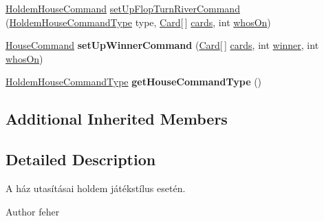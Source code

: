 \begin{DoxyCompactItemize}
\item 
\hyperlink{classhu_1_1elte_1_1bfw1p6_1_1poker_1_1command_1_1holdem_1_1_holdem_house_command}{Holdem\+House\+Command} \hyperlink{classhu_1_1elte_1_1bfw1p6_1_1poker_1_1command_1_1holdem_1_1_holdem_house_command_a6b278bd5bcc8114b0eadb3bcdeb4746c}{set\+Up\+Flop\+Turn\+River\+Command} (\hyperlink{enumhu_1_1elte_1_1bfw1p6_1_1poker_1_1command_1_1holdem_1_1type_1_1_holdem_house_command_type}{Holdem\+House\+Command\+Type} type, \hyperlink{classcom_1_1cantero_1_1games_1_1poker_1_1texasholdem_1_1_card}{Card}\mbox{[}$\,$\mbox{]} \hyperlink{classhu_1_1elte_1_1bfw1p6_1_1poker_1_1command_1_1_house_command_a2415f2465575a55375e7984a075eb17c}{cards}, int \hyperlink{classhu_1_1elte_1_1bfw1p6_1_1poker_1_1command_1_1_house_command_ad2d082dbec0a324d62472e5c48ef257f}{whos\+On})
\item 
\hypertarget{classhu_1_1elte_1_1bfw1p6_1_1poker_1_1command_1_1holdem_1_1_holdem_house_command_ab1ad29e1819296a43ba7b74bbd47c61d}{}\hyperlink{classhu_1_1elte_1_1bfw1p6_1_1poker_1_1command_1_1_house_command}{House\+Command} {\bfseries set\+Up\+Winner\+Command} (\hyperlink{classcom_1_1cantero_1_1games_1_1poker_1_1texasholdem_1_1_card}{Card}\mbox{[}$\,$\mbox{]} \hyperlink{classhu_1_1elte_1_1bfw1p6_1_1poker_1_1command_1_1_house_command_a2415f2465575a55375e7984a075eb17c}{cards}, int \hyperlink{classhu_1_1elte_1_1bfw1p6_1_1poker_1_1command_1_1_house_command_a7dc7a32601c36758c216ddca0fc9999e}{winner}, int \hyperlink{classhu_1_1elte_1_1bfw1p6_1_1poker_1_1command_1_1_house_command_ad2d082dbec0a324d62472e5c48ef257f}{whos\+On})\label{classhu_1_1elte_1_1bfw1p6_1_1poker_1_1command_1_1holdem_1_1_holdem_house_command_ab1ad29e1819296a43ba7b74bbd47c61d}

\item 
\hypertarget{classhu_1_1elte_1_1bfw1p6_1_1poker_1_1command_1_1holdem_1_1_holdem_house_command_a4fc16cade6201530aa0c7447c24c4463}{}\hyperlink{enumhu_1_1elte_1_1bfw1p6_1_1poker_1_1command_1_1holdem_1_1type_1_1_holdem_house_command_type}{Holdem\+House\+Command\+Type} {\bfseries get\+House\+Command\+Type} ()\label{classhu_1_1elte_1_1bfw1p6_1_1poker_1_1command_1_1holdem_1_1_holdem_house_command_a4fc16cade6201530aa0c7447c24c4463}

\end{DoxyCompactItemize}
\subsection*{Additional Inherited Members}


\subsection{Detailed Description}
A ház utasításai holdem játékstílus esetén. \begin{DoxyAuthor}{Author}
feher 
\end{DoxyAuthor}


